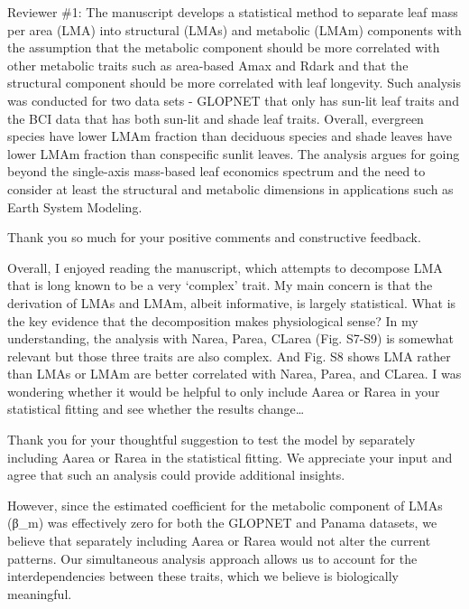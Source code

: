 \documentclass[
  12pt,
  letterpaper,
  DIV=11,
  numbers=noendperiod]{scrartcl}
\renewenvironment{quote}
  {\begin{customblockquote}\color{blockquote-text}\ignorespaces}
  {\end{customblockquote}}
\begin{document}
\begin{quote}
Reviewer \#1: The manuscript develops a statistical method to separate
leaf mass per area (LMA) into structural (LMAs) and metabolic (LMAm)
components with the assumption that the metabolic component should be
more correlated with other metabolic traits such as area-based Amax and
Rdark and that the structural component should be more correlated with
leaf longevity. Such analysis was conducted for two data sets - GLOPNET
that only has sun-lit leaf traits and the BCI data that has both sun-lit
and shade leaf traits. Overall, evergreen species have lower LMAm
fraction than deciduous species and shade leaves have lower LMAm
fraction than conspecific sunlit leaves. The analysis argues for going
beyond the single-axis mass-based leaf economics spectrum and the need
to consider at least the structural and metabolic dimensions in
applications such as Earth System Modeling.
\end{quote}

Thank you so much for your positive comments and constructive feedback.

\begin{quote}
Overall, I enjoyed reading the manuscript, which attempts to decompose
LMA that is long known to be a very `complex' trait. My main concern is
that the derivation of LMAs and LMAm, albeit informative, is largely
statistical. What is the key evidence that the decomposition makes
physiological sense? In my understanding, the analysis with Narea,
Parea, CLarea (Fig. S7-S9) is somewhat relevant but those three traits
are also complex. And Fig. S8 shows LMA rather than LMAs or LMAm are
better correlated with Narea, Parea, and CLarea. I was wondering whether
it would be helpful to only include Aarea or Rarea in your statistical
fitting and see whether the results change\ldots{}
\end{quote}

Thank you for your thoughtful suggestion to test the model by separately
including Aarea or Rarea in the statistical fitting. We appreciate your
input and agree that such an analysis could provide additional insights.

However, since the estimated coefficient for the metabolic component of
LMAs (β\_m) was effectively zero for both the GLOPNET and Panama
datasets, we believe that separately including Aarea or Rarea would not
alter the current patterns. Our simultaneous analysis approach allows us
to account for the interdependencies between these traits, which we
believe is biologically meaningful.
\end{document}
